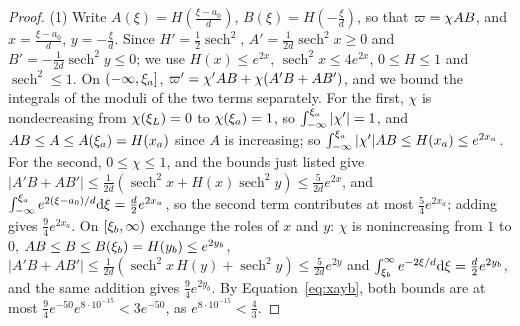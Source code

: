 \begin{proof}
(1) Write $A(\xi)=H(\frac{\xi-a_0}d)$, $B(\xi)=H(-\frac\xi d)$, so that
$\varpi=\chi AB$, and $x=\frac{\xi-a_0}d$, $y=-\frac\xi d$. Since
$H'=\frac12\operatorname{sech}^2$, $A'=\frac1{2d}\operatorname{sech}^2x\ge0$ and
$B'=-\frac1{2d}\operatorname{sech}^2y\le0$; we use $H(x)\le e^{2x}$,
$\operatorname{sech}^2x\le4e^{2x}$, $0\le H\le1$ and $\operatorname{sech}^2\le1$. On
$(-\infty,\xi_a]$, $\varpi'=\chi'AB+\chi(A'B+AB')$, and we bound the integrals of the
moduli of the two terms separately. For the first, $\chi$ is nondecreasing from
$\chi(\xi_L)=0$ to $\chi(\xi_a)=1$, so $\int_{-\infty}^{\xi_a}|\chi'|=1$, and $AB\le A\le A(\xi_a)=H(x_a)$ since $A$ is
increasing; so $\int_{-\infty}^{\xi_a}|\chi'|AB\le H(x_a)\le e^{2x_a}$. For the second,
$0\le\chi\le1$, and the bounds just listed give $|A'B+AB'|\le\frac1{2d}(\operatorname{sech}^2x+H(x)\operatorname{sech}^2y)
\le\frac5{2d}e^{2x}$, and $\int_{-\infty}^{\xi_a}e^{2(\xi-a_0)/d}\dd\xi=\frac d2e^{2x_a}$,
so the second term contributes at most $\frac54e^{2x_a}$;
adding gives $\frac94e^{2x_a}$. On $[\xi_b,\infty)$ exchange the roles of $x$ and
$y$: $\chi$ is nonincreasing from $1$ to $0$, $AB\le B\le B(\xi_b)=H(y_b)\le e^{2y_b}$,
$|A'B+AB'|\le\frac1{2d}(\operatorname{sech}^2x\,H(y)+\operatorname{sech}^2y)\le\frac5{2d}e^{2y}$
and $\int_{\xi_b}^\infty e^{-2\xi/d}\dd\xi=\frac d2e^{2y_b}$, and the same addition gives
$\frac94e^{2y_b}$. By Equation~\eqref{eq:xayb}, both
bounds are at most $\frac94e^{-50}e^{8\cdot10^{-15}}<3e^{-50}$, as
$e^{8\cdot10^{-15}}<\frac43$.


\end{proof}
